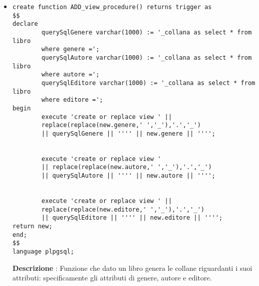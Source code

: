 \begin{itemize}
\begin{verbatim}
              select codA into f_codACntrl
              from disponibile_A
              where DOI = f_DOI_in and codA = f_codA;

              if f_codACntrl is not null then 
                    Delete from disponibile_A
                    Where (CodA=f_codA AND  DOI=f_DOI_in);
               end if;
            else
			
                f_acqStrngAppoINT := cast(f_acqStrngAppo as INTEGER);
			
                select codA into f_codACntrl
                from disponibile_A
                where DOI = f_DOI_in and codA = f_acqStrngAppoINT;
			
                if f_codACntrl is not null then 
                    Delete from disponibile_A
                    Where (CodA=f_acqStrngAppoINT AND  DOI=f_DOI_in);
                end if;
                f_acqStrngAppo := NULL;
            end if;
        end loop;
end;
$$
language plpgsql;
\end{verbatim}
{\bf Descrizione} : Funzione che data in ingresso un Articolo scientifico e una stringa composta da codici di Acquisti, separati da un '+', estrapola dalla stringa gli acquisti e elimina la disponibilità di un Articolo scientifico dagli Acquisti indicati.



\item\begin{verbatim}
create function ADD_view_procedure() returns trigger as
$$
declare
        querySqlGenere varchar(1000) := '_collana as select * from libro
        where genere =';
        querySqlAutore varchar(1000) := '_collana as select * from libro
        where autore =';
        querySqlEditore varchar(1000) := '_collana as select * from libro 
        where editore =';
begin
        execute 'create or replace view ' || 
        replace(replace(new.genere,' ','_'),'.','_')
        || querySqlGenere || '''' || new.genere || '''';


        execute 'create or replace view '
        || replace(replace(new.autore,' ','_'),'.','_')
        || querySqlAutore || '''' || new.autore || '''';

        
        execute 'create or replace view ' || 
        replace(replace(new.editore,' ','_'),'.','_') 
        || querySqlEditore || '''' || new.editore || '''';
return new;
end;
$$
language plpgsql;

\end{verbatim}
{\bf Descrizione} : Funzione che dato un libro  genera le collane riguardanti i suoi attributi: specificamente gli attributi di genere, autore e editore.




\end{itemize}
